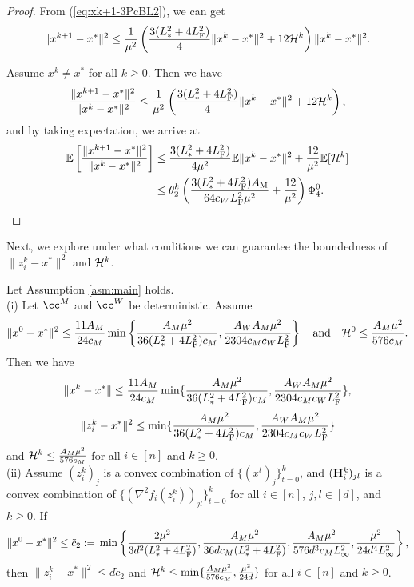 \documentclass[11pt]{article}
\begin{document}
\begin{proof}
		
		From (\ref{eq:xk+1-3PcBL2}), we can get 
		$$
		\|x^{k+1} - x^*\|^2 \leq \frac{1}{\mu^2} \left(  \frac{3(L_{*}^2+4L_{\rm F}^2)}{4} \|x^k-x^*\|^2 + 12 {\cal H}^k  \right) \|x^k-x^*\|^2. 
		$$
		
		Assume $x^k\neq x^*$ for all $k\geq 0$. Then we have 
		$$
		\frac{\|x^{k+1}-x^*\|^2}{\|x^k-x^*\|^2} \leq \frac{1}{\mu^2} \left(  \frac{3(L_{*}^2+4L_{\rm F}^2)}{4} \|x^k-x^*\|^2 + 12 {\cal H}^k  \right), 
		$$
		and by taking expectation, we arrive at  
		\begin{align*}
			\mathbb{E} \left[   \frac{\|x^{k+1}-x^*\|^2}{\|x^k-x^*\|^2} \right] & \leq \frac{3(L_{*}^2+4L_{\rm F}^2)}{4\mu^2} \mathbb{E}\|x^k-x^*\|^2 + \frac{12}{\mu^2} \mathbb{E}[{\cal H}^k] \\ 
			& \leq \theta_2^k \left(  \frac{3(L_{*}^2+4L_{\rm F}^2)A_{\rm M}}{64c_WL_{\rm F}^2\mu^2} + \frac{12}{\mu^2}  \right) \Phi_4^0. 
		\end{align*}
		
	\end{proof}
	
	
	Next, we explore under what conditions we can guarantee the boundedness of $\|z_i^k-x^*\|^2$ and ${\cal H}^k$. 
	
	\begin{theorem}\label{th:nbor-3PcBL2}
		Let Assumption \ref{asm:main} holds. \\ 
		(i) Let $\cc^M$ and $\cc^W$ be deterministic. Assume $$\|x^0 - x^*\|^2 \leq \frac{11A_M}{24c_M}\min\left\{  \frac{A_M \mu^2}{36(L_{*}^2+4L_{\rm F}^2)c_M}, \frac{A_WA_M \mu^2}{2304c_Mc_WL_{\rm F}^2}  \right\} \quad\text{and}\quad {\cal H}^0 \leq \frac{A_M \mu^2}{576c_M}.$$ Then we have $$\|x^k-x^*\| \leq \frac{11A_M}{24c_M} \min\{  \frac{A_M \mu^2}{36(L_{*}^2+4L_{\rm F}^2)c_M}, \frac{A_WA_M \mu^2}{2304c_Mc_WL_{\rm F}^2}  \},$$ $$\|z_i^k - x^*\|^2 \leq \min\{  \frac{A_M \mu^2}{36(L_{*}^2+4L_{\rm F}^2)c_M}, \frac{A_WA_M \mu^2}{2304c_Mc_WL_{\rm F}^2}  \}$$ and ${\cal H}^k \leq  \frac{A_M \mu^2}{576c_M}$ for all $i\in [n]$ and $k\geq 0$. \\ 
		
		(ii) Assume $(z_i^k)_j$ is a convex combination of $\{(x^t)_j\}_{t=0}^k$, and $(\mathbf{H}_i^k)_{jl}$ is a convex combination of $\{  (\nabla^2 f_i(z_i^k))_{jl}  \}_{t=0}^k$ for all $i\in [n]$, $j,l \in [d]$, and $k\geq 0$. If $$\|x^0-x^*\|^2 \leq {\tilde c}_2 \; { := }\; \min\left\{ \frac{2\mu^2}{3d^2 (L_{*}^2+4L_{\rm F}^2)}, \frac{A_M \mu^2}{36dc_M(L_{*}^2+4L_{\rm F}^2)}, \frac{A_M\mu^2}{576d^3c_ML_{\infty}^2}, \frac{\mu^2}{24d^4L_{\infty}^2} \right\},$$ then $\|z_i^k-x^*\|^2 \leq d {\tilde c}_2$ and ${\cal H}^k \leq \min \{  \frac{A_M\mu^2}{576c_M}, \frac{\mu^2}{24d}  \}$ for all $i\in [n]$ and $k\geq 0$. 
		
	\end{theorem}
	
\end{document}

